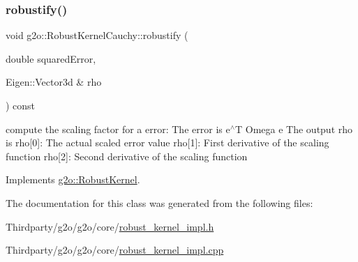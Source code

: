 \subsubsection{\texorpdfstring{robustify()}{robustify()}}
{\footnotesize\ttfamily void g2o\+::\+Robust\+Kernel\+Cauchy\+::robustify (\begin{DoxyParamCaption}\item[{double}]{squared\+Error,  }\item[{Eigen\+::\+Vector3d \&}]{rho }\end{DoxyParamCaption}) const\hspace{0.3cm}{\ttfamily [virtual]}}

compute the scaling factor for a error\+: The error is e$^\wedge$T Omega e The output rho is rho\mbox{[}0\mbox{]}\+: The actual scaled error value rho\mbox{[}1\mbox{]}\+: First derivative of the scaling function rho\mbox{[}2\mbox{]}\+: Second derivative of the scaling function 

Implements \mbox{\hyperlink{classg2o_1_1_robust_kernel_ab47b071a0cfe466be063f0104bc41d0f}{g2o\+::\+Robust\+Kernel}}.



The documentation for this class was generated from the following files\+:\begin{DoxyCompactItemize}
\item 
Thirdparty/g2o/g2o/core/\mbox{\hyperlink{robust__kernel__impl_8h}{robust\+\_\+kernel\+\_\+impl.\+h}}\item 
Thirdparty/g2o/g2o/core/\mbox{\hyperlink{robust__kernel__impl_8cpp}{robust\+\_\+kernel\+\_\+impl.\+cpp}}\end{DoxyCompactItemize}
